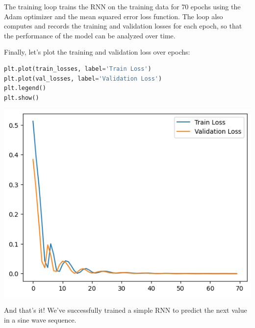 The training loop trains the RNN on the training data for 70 epochs
using the Adam optimizer and the mean squared error loss function. The
loop also computes and records the training and validation losses for
each epoch, so that the performance of the model can be analyzed over
time.\newline

Finally, let's plot the training and validation loss over epochs:

\begin{lstlisting}[language=Python]
plt.plot(train_losses, label='Train Loss')
plt.plot(val_losses, label='Validation Loss')
plt.legend()
plt.show()
\end{lstlisting}

\includegraphics{img//rnn//intro/output_19_0.png}

And that's it! We've successfully trained a simple RNN to predict the
next value in a sine wave sequence.
